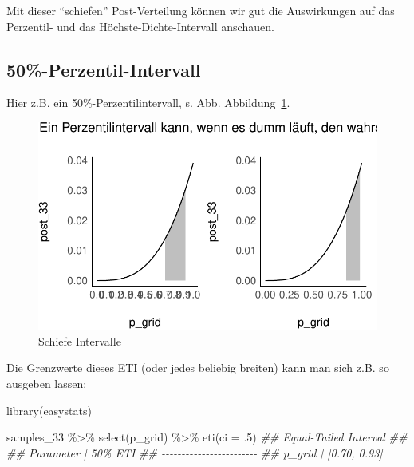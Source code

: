 \documentclass[
  a4paper,
  DIV=11]{scrreprt}
\newenvironment{Shaded}{\begin{snugshade}}{\end{snugshade}}
\newcommand{\AttributeTok}[1]{\textcolor[rgb]{0.40,0.45,0.13}{#1}}
\newcommand{\DecValTok}[1]{\textcolor[rgb]{0.68,0.00,0.00}{#1}}
\newcommand{\DocumentationTok}[1]{\textcolor[rgb]{0.37,0.37,0.37}{\textit{#1}}}
\newcommand{\FunctionTok}[1]{\textcolor[rgb]{0.28,0.35,0.67}{#1}}
\newcommand{\NormalTok}[1]{\textcolor[rgb]{0.00,0.23,0.31}{#1}}
\newcommand{\SpecialCharTok}[1]{\textcolor[rgb]{0.37,0.37,0.37}{#1}}
\theoremstyle{definition}
\theoremstyle{remark}
\begin{document}
Mit dieser ``schiefen'' Post-Verteilung können wir gut die Auswirkungen
auf das Perzentil- und das Höchste-Dichte-Intervall anschauen.

\hypertarget{perzentil-intervall}{%
\subsection{50\%-Perzentil-Intervall}\label{perzentil-intervall}}

Hier z.B. ein 50\%-Perzentilintervall, s. Abb.
Abbildung~\ref{fig-schief}.

\begin{figure}

{\centering \includegraphics{./Post_files/figure-pdf/fig-schief-1.pdf}

}

\caption{\label{fig-schief}Schiefe Intervalle}

\end{figure}

Die Grenzwerte dieses ETI (oder jedes beliebig breiten) kann man sich
z.B. so ausgeben lassen:

\begin{Shaded}
\begin{Highlighting}[]
\FunctionTok{library}\NormalTok{(easystats)}

\NormalTok{samples\_33 }\SpecialCharTok{\%\textgreater{}\%} 
  \FunctionTok{select}\NormalTok{(p\_grid) }\SpecialCharTok{\%\textgreater{}\%} 
  \FunctionTok{eti}\NormalTok{(}\AttributeTok{ci =}\NormalTok{ .}\DecValTok{5}\NormalTok{)}
\DocumentationTok{\#\# Equal{-}Tailed Interval}
\DocumentationTok{\#\# }
\DocumentationTok{\#\# Parameter |      50\% ETI}
\DocumentationTok{\#\# {-}{-}{-}{-}{-}{-}{-}{-}{-}{-}{-}{-}{-}{-}{-}{-}{-}{-}{-}{-}{-}{-}{-}{-}}
\DocumentationTok{\#\# p\_grid    | [0.70, 0.93]}
\end{Highlighting}
\end{Shaded}
\end{document}
